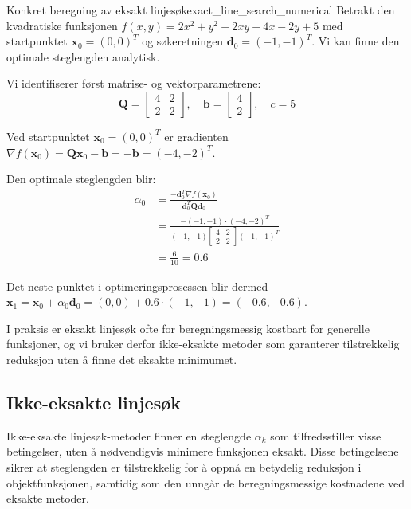 \begin{example}{Konkret beregning av eksakt linjesøk}{exact_line_search_numerical}
	Betrakt den kvadratiske funksjonen $f(x,y) = 2x^2 + y^2 + 2xy - 4x - 2y + 5$ med startpunktet 
	$\symbf{x}_0 = (0,0)^T$ og søkeretningen $\symbf{d}_0 = (-1,-1)^T$. Vi kan finne den optimale steglengden analytisk.

	Vi identifiserer først matrise- og vektorparametrene:
	\[
		\symbf{Q} = \begin{bmatrix} 4 & 2 \\ 2 & 2 \end{bmatrix}, \quad
		\symbf{b} = \begin{bmatrix} 4 \\ 2 \end{bmatrix}, \quad
		c = 5
	\]

	Ved startpunktet $\symbf{x}_0 = (0,0)^T$ er gradienten $\nabla f(\symbf{x}_0) = \symbf{Q}\symbf{x}_0 - \symbf{b} = -\symbf{b} = (-4,-2)^T$.
	
	Den optimale steglengden blir:
	\begin{align*}
		\alpha_0 &= \frac{-\symbf{d}_0^T\nabla f(\symbf{x}_0)}{\symbf{d}_0^T\symbf{Q}\symbf{d}_0} \\
		&= \frac{-(-1,-1)\cdot(-4,-2)^T}{(-1,-1)\begin{bmatrix} 4 & 2 \\ 2 & 2 \end{bmatrix}(-1,-1)^T} \\
		&= \frac{6}{10} = 0.6
	\end{align*}

	Det neste punktet i optimeringsprosessen blir dermed 
	$\symbf{x}_1 = \symbf{x}_0 + \alpha_0 \symbf{d}_0 = (0,0) + 0.6 \cdot (-1,-1) = (-0.6, -0.6)$.
\end{example}

I praksis er eksakt linjesøk ofte for beregningsmessig kostbart for generelle funksjoner, og vi bruker derfor ikke-eksakte metoder som garanterer tilstrekkelig reduksjon uten å finne det eksakte minimumet.

\subsection{Ikke-eksakte linjesøk}
\label{subsec:inexact_line_search}
Ikke-eksakte linjesøk-metoder finner en steglengde \(\alpha_k\) som tilfredsstiller visse betingelser, uten å nødvendigvis minimere funksjonen eksakt.
Disse betingelsene sikrer at steglengden er tilstrekkelig for å oppnå en betydelig reduksjon i objektfunksjonen, samtidig som den unngår de beregningsmessige kostnadene ved eksakte metoder.

